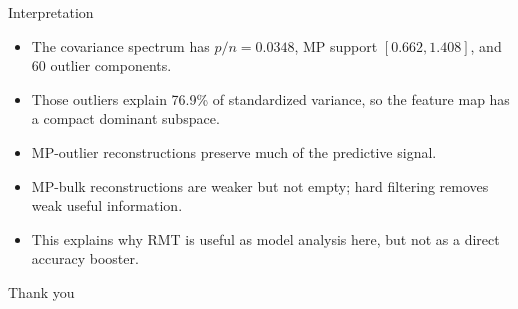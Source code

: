 \documentclass[english, xcolor=dvipsnames, aspectratio=169]{beamer}
\begin{document}
\begin{frame}{Interpretation}
\begin{itemize}
\item The covariance spectrum has \(p/n=0.0348\), MP support \([0.662,1.408]\), and 60 outlier components.
\item Those outliers explain 76.9\% of standardized variance, so the feature map has a compact dominant subspace.
\item MP-outlier reconstructions preserve much of the predictive signal.
\item MP-bulk reconstructions are weaker but not empty; hard filtering removes weak useful information.
\item This explains why RMT is useful as model analysis here, but not as a direct accuracy booster.
\end{itemize}
\end{frame}

\begin{frame}[plain]
\centering
\vfill
{\Huge Thank you}
\vfill
\end{frame}
\end{document}
